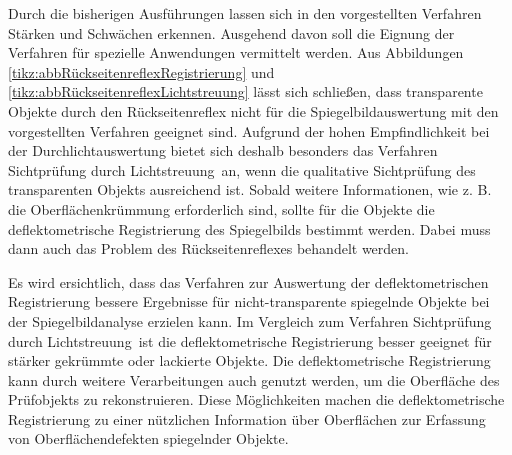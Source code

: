 \noindent
Durch die bisherigen Ausführungen lassen sich in den vorgestellten Verfahren Stärken und Schwächen erkennen.
Ausgehend davon soll die Eignung der Verfahren für spezielle Anwendungen vermittelt werden.
Aus Abbildungen \ref{tikz:abbRückseitenreflexRegistrierung} und \ref{tikz:abbRückseitenreflexLichtstreuung} lässt sich schließen, dass transparente Objekte durch den Rückseitenreflex nicht für die Spiegelbildauswertung mit den vorgestellten Verfahren geeignet sind.
Aufgrund der hohen Empfindlichkeit bei der Durchlichtauswertung bietet sich deshalb besonders das Verfahren \glqq Sichtprüfung durch Lichtstreuung\grqq ~an, wenn die qualitative Sichtprüfung des transparenten Objekts ausreichend ist.
Sobald weitere Informationen, wie z. B. die Oberflächenkrümmung erforderlich sind, sollte für die Objekte die deflektometrische Registrierung des Spiegelbilds bestimmt werden.
Dabei muss dann auch das Problem des Rückseitenreflexes behandelt werden.

\p
Es wird ersichtlich, dass das Verfahren zur Auswertung der deflektometrischen Registrierung bessere Ergebnisse für nicht-transparente spiegelnde Objekte bei der Spiegelbildanalyse erzielen kann.
Im Vergleich zum Verfahren \glqq Sichtprüfung durch Lichtstreuung\grqq ~ist die deflektometrische Registrierung besser geeignet für stärker gekrümmte oder lackierte Objekte.
Die deflektometrische Registrierung kann durch weitere Verarbeitungen auch genutzt werden, um die Oberfläche des Prüfobjekts zu rekonstruieren.
Diese Möglichkeiten machen die deflektometrische Registrierung zu einer nützlichen Information über Oberflächen zur Erfassung von Oberflächendefekten spiegelnder Objekte.